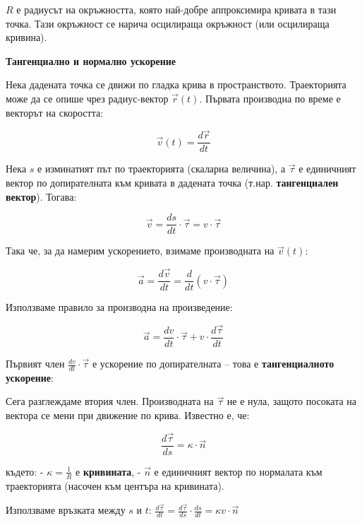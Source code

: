 \documentclass{report}
\begin{document}

$R$ е радиусът на окръжността, която най-добре аппроксимира кривата в тази точка. Тази окръжност се нарича осцилираща окръжност (или осцилираща кривина).


\medskip
\textbf{Тангенциално и нормално ускорение}\
\medskip

Нека дадената точка се движи по гладка крива в пространството. Траекторията може да се опише чрез радиус-вектор \(\vec{r}(t)\). Първата производна по време е векторът на скоростта:

\[
\vec{v}(t) = \frac{d\vec{r}}{dt}
\]

Нека \(s\) е изминатият път по траекторията (скаларна величина), а \(\vec{\tau}\) е единичният вектор по допирателната към кривата в дадената точка (т.нар. \textbf{тангенциален вектор}). Тогава:

\[
\vec{v} = \frac{ds}{dt} \cdot \vec{\tau} = v \cdot \vec{\tau}
\]

Така че, за да намерим ускорението, взимаме производната на \(\vec{v}(t)\):

\[
\vec{a} = \frac{d\vec{v}}{dt} = \frac{d}{dt}(v \cdot \vec{\tau})
\]

Използваме правило за производна на произведение:

\[
\vec{a} = \frac{dv}{dt} \cdot \vec{\tau} + v \cdot \frac{d\vec{\tau}}{dt}
\]

Първият член \(\frac{dv}{dt} \cdot \vec{\tau}\) е ускорение по допирателната – това е \textbf{тангенциалното ускорение}:

\cor{}{\[
\vec{a}_\tau = \frac{dv}{dt} \cdot \vec{\tau}
\]}

Сега разглеждаме втория член. Производната на \(\vec{\tau}\) не е нула, защото посоката на вектора се мени при движение по крива. Известно е, че:

\[
\frac{d\vec{\tau}}{ds} = \kappa \cdot \vec{n}
\]

където:
- \(\kappa = \frac{1}{R}\) е \textbf{кривината},
- \(\vec{n}\) е единичният вектор по нормалата към траекторията (насочен към центъра на кривината).

Използваме връзката между \(s\) и \(t\): \(\frac{d\vec{\tau}}{dt} = \frac{d\vec{\tau}}{ds} \cdot \frac{ds}{dt} = \kappa v \cdot \vec{n}\)
\end{document}
